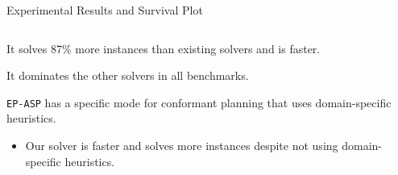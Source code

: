 \documentclass[aspectratio=169,svgnames,xcolor=table,t]{beamer}
\begin{document}
\begin{frame}{Experimental Results and Survival Plot}
    \thispagestyle{empty} 
    \begin{columns}[T]
        \begin{column}{0.45\textwidth}
            \begin{myitemize}
                \small
                \item It solves 87\% more instances than existing solvers and is  faster.

                \bigskip

                \item It dominates the other solvers in all benchmarks.
                
                \bigskip
                
                \item \texttt{EP-ASP} has a specific mode for conformant planning that uses domain-specific heuristics.
                \begin{itemize}
                    \item Our solver is  faster and solves  more instances despite not using domain-specific heuristics.
                \end{itemize}
            \end{myitemize}
        \end{column}
        \begin{column}{0.5\textwidth}
            \hspace*{-15pt}
            
        \end{column}
    \end{columns}
\end{frame}
            
\end{document}
